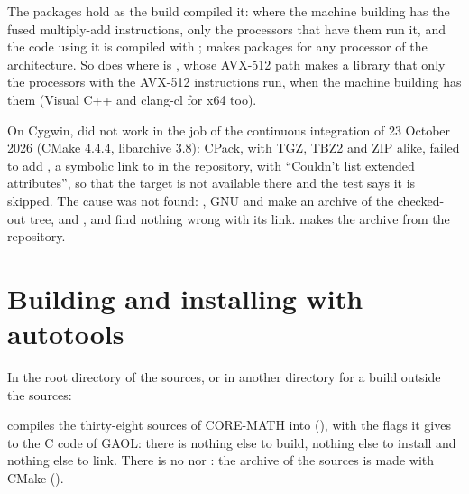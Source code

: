 \documentclass[12pt,a4paper,twoside,openright]{book}
\begin{document}
\noindent
The packages hold  as the build compiled it: where the machine
building has the fused multiply-add instructions, only the processors that
have them run it, and the code using it is compiled with ;
 makes packages for any processor of the
architecture. So does  where
 is , whose AVX-512 path makes a
library that only the processors with the AVX-512 instructions run, when the
machine building has them (Visual C++ and clang-cl for x64 too).\newinvfive

\begin{Rem}
On Cygwin,  did not work in the job of the continuous
integration of 23 October 2026 (CMake 4.4.4, libarchive 3.8): CPack, with
TGZ, TBZ2 and ZIP alike, failed to add , a symbolic link to
 in the repository, with ``Couldn't list extended
attributes'', so that the target is not available there and the test
 says it is skipped. The cause was not found:
, GNU  and  make an archive of
the checked-out tree, and ,  and
 find nothing wrong with its link.  makes
the archive from the repository.
\end{Rem}

\section{Building and installing with autotools}\label{sec:configuration}
%

In the root directory of the sources, or in another directory for a build
outside the sources:

\begin{cmdshell}
\end{cmdshell}

\noindent
{} compiles the thirty-eight sources of CORE-MATH into
 (), with the flags it gives to the C
code of GAOL: there is nothing else to build, nothing else to install and
nothing else to link. There is no  nor :
the archive of the sources is made with CMake ().
\end{document}

